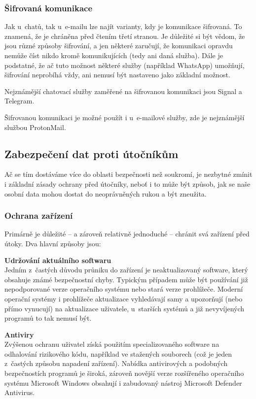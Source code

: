 \subsubsection*{Šifrovaná komunikace}
Jak u~chatů, tak u~e-mailu lze najít varianty, kdy je komunikace šifrovaná. To znamená, že je chráněna před čtením třetí stranou. Je důležité si být vědom, že jsou různé způsoby šifrování, a jen některé zaručují, že komunikaci opravdu nemůže číst nikdo kromě komunikujících (tedy ani daná služba). Dále je podstatné, že ač tuto možnost některé služby (například WhatsApp) umožňují, šifrování neprobíhá vždy, ani nemusí být nastaveno jako základní možnost.

Nejznámější chatovací služby zaměřené na šifrovanou komunikaci jsou Signal a Telegram.

Šifrovanou komunikaci je možné použít i u~e-mailové služby, zde je nejznámější službou ProtonMail. 


\subsection{Zabezpečení dat proti útočníkům}
Ač se tím dostáváme více do oblasti bezpečnosti než soukromí, je nezbytné zmínit i základní zásady ochrany před útočníky, neboť i to může být způsob, jak se naše osobní data mohou dostat do neoprávněných rukou a být zneužita.

\subsubsection*{Ochrana zařízení}
Primárně je důležité -- a zároveň relativně jednoduché -- chránit svá zařízení před útoky. Dva hlavní způsoby jsou:

\textbf{Udržování aktuálního softwaru}\\
Jedním z~častých důvodu průniku do zařízení je neaktualizovaný software, který obsahuje známé bezpečnostní chyby. Typickým případem může být používání již nepodporované verze operačního systému nebo stará verze prohlížeče. Moderní operační systémy i prohlížeče aktualizace vyhledávají samy a upozorňují (nebo přímo vynucují) na aktualizace uživatele, u~starších systémů a již nevyvíjených programů to tak nemusí být.

\textbf{Antiviry}\\
Zvýšenou ochranu uživatel získá použitím specializovaného software na odhalování rizikového kódu, například ve stažených souborech (což je jeden z~častých způsobu napadení zařízení). Nabídka antivirových a podobných bezpečnostích programů je široká, zároveň novější verze rozšířeného operačního systému Microsoft Windows obsahují i zabudovaný nástroj Microsoft Defender Antivirus.

